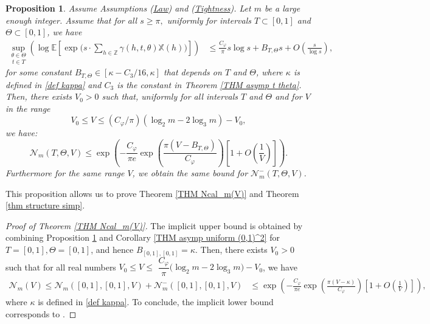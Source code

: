 \documentclass[12pt]{amsart}
\newtheorem{pro}[thm]{Proposition}
\theoremstyle{definition}
\numberwithin{equation}{section}
\numberwithin{equation}{section}
\def\E{\mathbb{E}}
\def\Ncal{\mathcal{N}}
\def\Z{\mathbb{Z}}
\def\Mp{C_\varphi}
\def\X{\mathbb{X}}
\def\E{\mathbb{E}}
\begin{document}
\begin{pro}\label{Pro final canonic unif T,Theta} Assume Assumptions (\hyperlink{Ass Law}{Law}) and (\hyperlink{Ass Tightness}{Tightness}). Let $m$ be a large enough integer. Assume that for all $s \geq \pi,$ uniformly for intervals $T\subset[0,1]$ and $\Theta\subset[0,1]$, we have
\begin{align*}
\underset{t\in T}{\sup_{\theta\in\Theta}}
\left(
\log \E \left[\exp \Big(s \cdot \sum_{h \in \Z}
   \gamma(h,t,\theta)\X(h)\Big) \right] \right)
     &\leq  \frac{\Mp}{\pi} s \log s+B_{T,\Theta} s+ O\left(\frac{s}{\log s}\right),
\end{align*}
for some constant $B_{T,\Theta}\in [\kappa- C_3/16,\kappa]$ that depends on $T$ and $\Theta$, where $ \kappa$ is defined in \eqref{def kappa} and $C_3$ is the constant in  Theorem \ref{THM asymp t theta}.
Then, there exists $V_0>0$ such that, uniformly for all intervals $T$ and $\Theta$ and for $V$ in the range $$V_0\leq V \leq (\Mp /\pi)\left(\log_2 m-2\log_3 m\right)-V_0,$$ we have:
\begin{equation}
    \Ncal_m(T,\Theta,V)
    \leq 
\exp\left(- \frac{\Mp}{\pi e} \exp\left(\frac{\pi (V-B_{T,\Theta})}{\Mp}\right)\left[1+O\left(\frac{1}{V}\right)\right] 
\right).
\end{equation}
Furthermore for the same range $V$, we obtain the same bound for $\Ncal_m^-(T,\Theta,V)$.
\end{pro}

This proposition allows us to prove Theorem \ref{THM Ncal_m(V)} and Theorem \ref{thm structure simp}.

\begin{proof}[Proof of Theorem \ref{THM Ncal_m(V)}] The implicit upper bound is obtained by combining Proposition \ref{Pro final canonic unif T,Theta} and Corollary \ref{THM asymp  uniform (0,1)^2} for $T = [0,1],\Theta = [0,1]$, and hence $B_{[0,1],[0,1]} = \kappa.$
Then, there exists $V_0>0$ such that for all real numbers $V_0\leq  V \leq$
$\dfrac{\Mp}{\pi}\big(\log_2 m -2\log_3 m\big)-V_0$, we have
\begin{align}\label{eq THM 1.1}
    \Ncal_m(V) \leq \Ncal_m([0,1],[0,1],V)+\Ncal_m^-([0,1],[0,1],V) 
    & \leq \exp\left(- \frac{\Mp}{\pi e} \exp\left(\frac{\pi (V-\kappa)}{\Mp}\right)\left[1
+O\left(\frac{1}{V}\right)\right] 
\right),
\end{align}
where $\kappa$ is defined in \eqref{def kappa}. To conclude, the implicit lower bound corresponds to \cite[Theorem~1.6]{ABL21}.
\end{proof}
\end{document}

